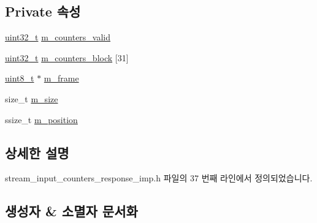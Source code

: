 \subsection*{Private 속성}
\begin{DoxyCompactItemize}
\item 
\hyperlink{parse_8c_a6eb1e68cc391dd753bc8ce896dbb8315}{uint32\+\_\+t} \hyperlink{classavdecc__lib_1_1stream__input__counters__response__imp_ab528aa8ed91b0a6453238e605c451ce8}{m\+\_\+counters\+\_\+valid}
\item 
\hyperlink{parse_8c_a6eb1e68cc391dd753bc8ce896dbb8315}{uint32\+\_\+t} \hyperlink{classavdecc__lib_1_1stream__input__counters__response__imp_a4280ad18b84e17884a0eca22237e22a9}{m\+\_\+counters\+\_\+block} \mbox{[}31\mbox{]}
\item 
\hyperlink{stdint_8h_aba7bc1797add20fe3efdf37ced1182c5}{uint8\+\_\+t} $\ast$ \hyperlink{classavdecc__lib_1_1stream__input__counters__response__imp_a50417969cf438e7c8d698726bbbe2ff9}{m\+\_\+frame}
\item 
size\+\_\+t \hyperlink{classavdecc__lib_1_1stream__input__counters__response__imp_a0dc3c363255f193681c77b4d2a82e995}{m\+\_\+size}
\item 
ssize\+\_\+t \hyperlink{classavdecc__lib_1_1stream__input__counters__response__imp_af5e691c4a8a0feb07f48440b321206cd}{m\+\_\+position}
\end{DoxyCompactItemize}


\subsection{상세한 설명}


stream\+\_\+input\+\_\+counters\+\_\+response\+\_\+imp.\+h 파일의 37 번째 라인에서 정의되었습니다.



\subsection{생성자 \& 소멸자 문서화}

